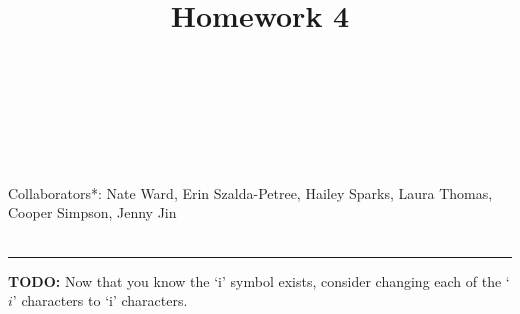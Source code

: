 \documentclass[10pt]{amsart}
\newcommand{\I}{\mathrm{i}}
\theoremstyle{nonumberplain}
\begin{document}
\pagestyle{empty}

\newcommand{\mline}{\vspace{.2in}\hrule\vspace{.2in}}

\noindent
{} \\
 \\
 \\
 \\

\title{\bf { Homework 4} }


\maketitle
\noindent
Collaborators*: Nate Ward, Erin Szalda-Petree, Hailey Sparks, Laura Thomas, Cooper Simpson, Jenny Jin \\
\\
\tiny
{}
\normalsize
\mline
\noindent
\textbf{TODO:} Now that you know the `$\I$' symbol exists, consider changing each of the `$i$' characters to `$\I$' characters.
\end{document}
